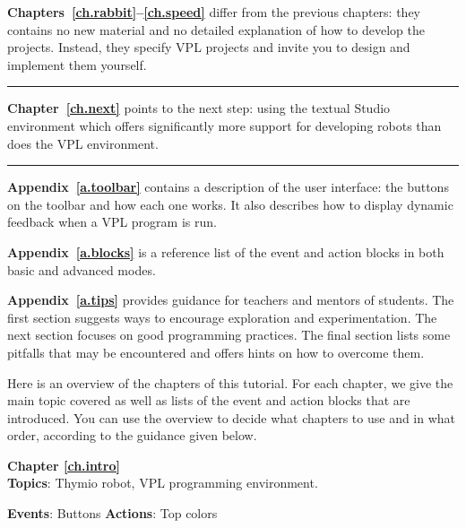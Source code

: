 \bigskip

\textbf{Chapters~\ref{ch.rabbit}--\ref{ch.speed}} differ from the
previous chapters: they contains no new material and no detailed
explanation of how to develop the projects. Instead, they specify VPL
projects and invite you to design and implement them yourself.

\bigskip

\hrule

\bigskip

\textbf{Chapter~\ref{ch.next}} points to the next step: using the
textual Studio environment which offers significantly more support for
developing robots than does the VPL environment.

\bigskip

\hrule

\bigskip


\textbf{Appendix~\ref{a.toolbar}} contains a description of the user
interface: the buttons on the toolbar and how each one works. It also
describes how to display dynamic feedback when a VPL program is run.

\textbf{Appendix~\ref{a.blocks}} is a reference list of the event and
action blocks in both basic and advanced modes.

\textbf{Appendix~\ref{a.tips}} provides guidance for teachers and
mentors of students. The first section suggests ways to encourage
exploration and experimentation. The next section focuses on good
programming practices. The final section lists some pitfalls that may be
encountered and offers hints on how to overcome them.

\bigskip


Here is an overview of the chapters of this tutorial. For each chapter,
we give the main topic covered as well as lists of the event and action
blocks that are introduced. You can use the overview to decide what
chapters to use and in what order, according to the guidance given
below.

{\centering \textbf{Chapter \ref{ch.intro}}\\}
\textbf{Topics}: Thymio robot, VPL programming environment.

\textbf{Events}: Buttons \hfill \textbf{Actions}: Top colors


